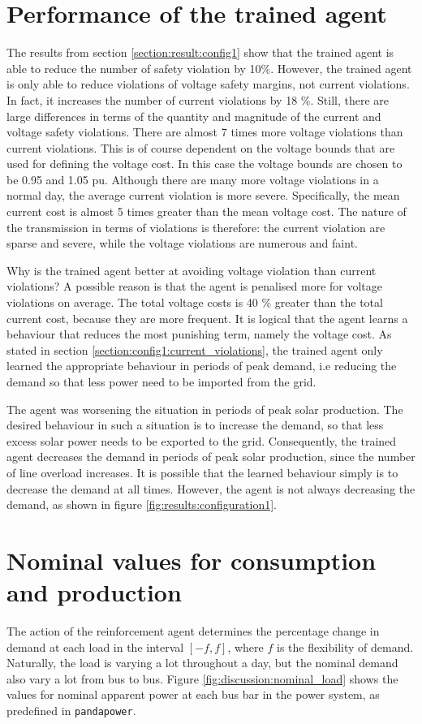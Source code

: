 \documentclass[class=book, crop=false]{standalone}
\begin{document}
\section{Performance of the trained agent}
The results from section \ref{section:result:config1} show that the trained agent is able to reduce the number of safety violation by 10\%. However, the trained agent is only able to reduce violations of voltage safety margins, not current violations. In fact, it increases the number of current violations by 18 \%. Still, there are large differences in terms of the quantity and magnitude of the current and voltage safety violations. There are almost 7 times more voltage violations than current violations. This is of course dependent on the voltage bounds that are used for defining the voltage cost. In this case the voltage bounds are chosen to be 0.95 and 1.05 pu. Although there are many more voltage violations in a normal day, the average current violation is more severe. Specifically, the mean current cost is almost 5 times greater than the mean voltage cost. The nature of the transmission in terms of violations is therefore: the current violation are sparse and severe, while the voltage violations are numerous and faint. 

Why is the trained agent better at avoiding voltage violation than current violations? A possible reason is that the agent is penalised more for voltage violations on average. The total voltage costs is 40 \% greater than the total current cost, because they are more frequent. It is logical that the agent learns a behaviour that reduces the most punishing term, namely the voltage cost. As stated in section \ref{section:config1:current_violations}, the trained agent only learned the appropriate behaviour in periods of peak demand, i.e reducing the demand so that less power need to be imported from the grid.

The agent was worsening the situation in periods of peak solar production. The desired behaviour in such a situation is to increase the demand, so that less excess solar power needs to be exported to the grid. Consequently, the trained agent decreases the demand in periods of peak solar production, since the number of line overload increases. It is possible that the learned behaviour simply is to decrease the demand at all times. However, the agent is not always decreasing the demand, as shown in figure \ref{fig:results:configuration1}.

\section{Nominal values for consumption and production}
The action of the reinforcement agent determines the percentage change in demand at each load in the interval $[-f,f]$, where $f$ is the flexibility of demand. Naturally, the load is varying a lot throughout a day, but the nominal demand also vary a lot from bus to bus. Figure \ref{fig:discussion:nominal_load} shows the values for nominal apparent power at each bus bar in the power system, as predefined in \texttt{pandapower}.
\end{document}
